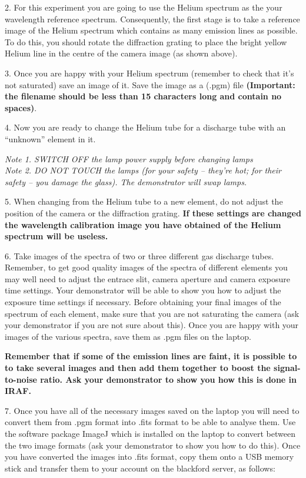 \documentclass[12pt]{article}
\begin{document}
2. For this experiment you are going to use the Helium spectrum as the
   your wavelength reference spectrum. Consequently, the first stage
   is to take a reference image of the Helium spectrum which contains
   as many emission lines as possible. To do this, you should rotate
   the diffraction grating to place the bright yellow Helium line in
   the centre of the camera image (as shown above).

3. Once you are happy with your Helium spectrum (remember to check
   that it's not saturated) save an image of it. Save the image as a (.pgm)
   file {\bf(Important: the filename should be less than 15 characters long
   and contain no spaces)}.

4. Now you are ready to change the Helium tube for a discharge tube
   with an ``unknown'' element in it.

{\sl Note 1. SWITCH OFF the lamp power supply before changing lamps}\\
{\sl Note 2. DO NOT TOUCH the lamps (for your safety -- they're hot; 
for their safety -- you damage the glass). The demonstrator will swap 
lamps.}

\newpage

5. When changing from the Helium tube to a new element, do not adjust
   the position of the camera or the diffraction grating. {\bf If these
   settings are changed the wavelength calibration image you have
   obtained of the Helium spectrum will be useless.}


6. Take images of the spectra of two or three different gas discharge
   tubes. Remember, to get good quality images of the spectra of
   different elements you may well need to adjust the entrace slit,
   camera aperture and camera exposure time settings. Your
   demonstrator will be able to show you how to adjust the exposure
   time settings if necessary. Before obtaining your final images of
   the spectrum of each element, make sure that you are not saturating
   the camera (ask your demonstrator if you are not sure about
   this). Once you are happy with your images of the various spectra,
   save them as .pgm files on the laptop.

   {\bf Remember that if some of the emission lines are faint, it is possible to to take
several images and then add them together to boost the signal-to-noise
ratio. Ask your demonstrator to show you how this is done in IRAF.}



7. Once you have all of the necessary images saved on the laptop you will need to convert them
from .pgm format into .fits format to be able to analyse them. Use the software package {\sc ImageJ} which is installed on the laptop to convert between the two image formats (ask your demonstrator to show you how to do this). Once you have converted the images into .fits format, copy them onto a USB memory stick and transfer them to your account on the blackford server, as follows:
\end{document}
